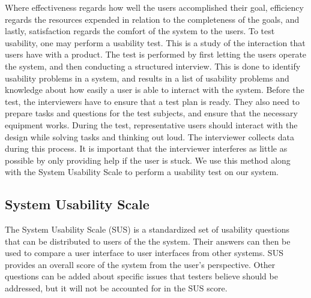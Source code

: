 Where effectiveness regards how well the users accomplished their goal, efficiency regards the resources expended in relation to the completeness of the goals, and lastly, satisfaction regards the comfort of the system to the users.
To test usability, one may perform a usability test. This is a study of the interaction that users have with a product. The test is performed by first letting the users operate the system, and then conducting a structured interview. This is done to identify usability problems in a system, and results in a list of usability problems and knowledge about how easily a user is able to interact with the system.
Before the test, the interviewers have to ensure that a test plan is ready.
They also need to prepare tasks and questions for the test subjects, and ensure that the necessary equipment works.
During the test, representative users should interact with the design while solving tasks and thinking out loud. The interviewer collects data during this process. It is important that the interviewer interferes as little as possible by only providing help if the user is stuck.
\cite{deb7} We use this method along with the System Usability Scale to perform a usability test on our system.

\subsection{System Usability Scale} \label{sec:SUSScore}
The System Usability Scale (SUS) is a standardized set of usability questions that can be distributed to users of the the system.
Their answers can then be used to compare a user interface to user interfaces from other systems.
SUS provides an overall score of the system from the user's perspective.
Other questions can be added about specific issues that testers believe should be addressed, but it will not be accounted for in the SUS score.\cite{adobeSUS}

